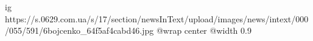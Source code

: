  
 
 
 
 

\ifcmt
  ig https://s.0629.com.ua/s/17/section/newsInText/upload/images/news/intext/000/055/591/6bojcenko_64f5af4cabd46.jpg
  @wrap center
  @width 0.9
\fi

